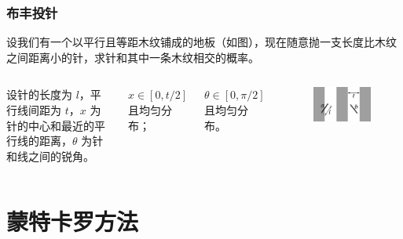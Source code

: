 \documentclass{beamer}
\begin{document}
\begin{frame}
    \frametitle{布丰投针}

    \begin{problem}
        设我们有一个以平行且等距木纹铺成的地板（如图），现在随意抛一支长度比木纹之间距离小的针，求针和其中一条木纹相交的概率。
    \end{problem}

    \begin{columns}

        设针的长度为 $l$，平行线间距为 $t$，$x$ 为针的中心和最近的平行线的距离，$\theta$ 为针和线之间的锐角。

        $x \in [0, t/2]$ 且均匀分布；

        $\theta \in [0, \pi/2]$ 且均匀分布。

   
        \begin{figure}
            \centering
            \includegraphics[width=.95\textwidth]{res/buffon.png}
        \end{figure} 
    \end{columns}

\end{frame}

\section{蒙特卡罗方法}
\end{document}
